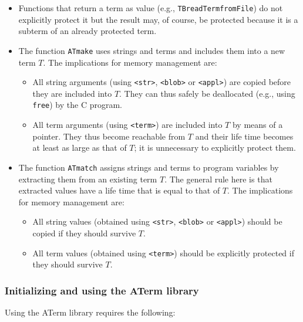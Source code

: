 \documentclass[twoside]{article} %
\begin{document}
\begin{itemize}

\item Functions that return a term as value (e.g., {\tt TBreadTermfromFile}) 
do not explicitly protect it but the result may, of course, be
protected because it is a subterm of an already protected term.

\item The function {\tt ATmake} uses strings and terms and includes
them into a new term $T$. The implications for memory management are:
\begin{itemize}
\item All string arguments (using {\tt <str>}, {\tt <blob>} or {\tt <appl>})
are copied before they are included into $T$.
They can thus safely be deallocated (e.g., using {\tt free}) by the C program.

\item All term arguments (using {\tt <term>}) are included
into $T$ by means of a pointer.
They thus become reachable from $T$ and
their life time becomes at least as large as that of $T$;
it is unnecessary to explicitly protect them.
\end{itemize}

\item The function {\tt ATmatch} assigns strings and terms to program variables
by extracting them from an existing term $T$. The general rule here is that
extracted values have a life time that is equal to that of $T$.
The implications for memory management are:
\begin{itemize}
\item All string values (obtained using {\tt <str>}, {\tt <blob>} or {\tt <appl>})
should be copied if they should survive $T$.
\item All term values (obtained using {\tt <term>}) should
be explicitly protected if they should survive $T$.
\end{itemize}

\end{itemize}


\subsubsection{Initializing and using the ATerm library}\label{ATinit}

Using the ATerm library requires the following:
\end{document}
